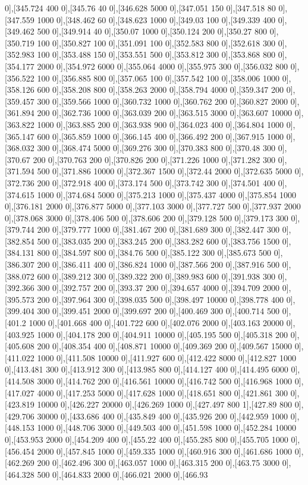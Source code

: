 {0],[345.724 400 0],[345.76 40 0],[346.628 5000 0],[347.051 150 0],[347.518 80 0],[347.559 1000 0],[348.462 60 0],[348.623 1000 0],[349.03 100 0],[349.339 400 0],[349.462 500 0],[349.914 40 0],[350.07 1000 0],[350.124 200 0],[350.27 800 0],[350.719 100 0],[350.827 100 0],[351.091 100 0],[352.583 800 0],[352.618 300 0],[352.983 100 0],[353.488 150 0],[353.551 500 0],[353.812 300 0],[353.868 800 0],[354.177 2000 0],[354.972 6000 0],[355.064 4000 0],[355.975 300 0],[356.032 800 0],[356.522 100 0],[356.885 800 0],[357.065 100 0],[357.542 100 0],[358.006 1000 0],[358.126 600 0],[358.208 800 0],[358.263 2000 0],[358.794 4000 0],[359.347 200 0],[359.457 300 0],[359.566 1000 0],[360.732 1000 0],[360.762 200 0],[360.827 2000 0],[361.894 200 0],[362.736 1000 0],[363.039 200 0],[363.515 3000 0],[363.607 10000 0],[363.822 1000 0],[363.885 200 0],[363.938 900 0],[364.023 400 0],[364.804 1000 0],[365.147 600 0],[365.859 1000 0],[366.145 400 0],[366.492 200 0],[367.915 1000 0],[368.032 300 0],[368.474 5000 0],[369.276 300 0],[370.383 800 0],[370.48 300 0],[370.67 200 0],[370.763 200 0],[370.826 200 0],[371.226 1000 0],[371.282 300 0],[371.594 500 0],[371.886 10000 0],[372.367 1500 0],[372.44 2000 0],[372.635 5000 0],[372.736 200 0],[372.918 400 0],[373.174 500 0],[373.742 300 0],[374.501 400 0],[374.615 1000 0],[374.684 5000 0],[375.213 1000 0],[375.437 4000 0],[375.854 1000 0],[376.181 2000 0],[376.877 5000 0],[377.103 3000 0],[377.727 500 0],[377.937 2000 0],[378.068 3000 0],[378.406 500 0],[378.606 200 0],[379.128 500 0],[379.173 300 0],[379.744 200 0],[379.777 1000 0],[381.467 200 0],[381.689 300 0],[382.447 300 0],[382.854 500 0],[383.035 200 0],[383.245 200 0],[383.282 600 0],[383.756 1500 0],[384.131 800 0],[384.597 800 0],[384.76 500 0],[385.122 300 0],[385.673 500 0],[386.307 200 0],[386.411 400 0],[386.824 1000 0],[387.566 200 0],[387.916 500 0],[388.072 600 0],[389.212 300 0],[389.322 200 0],[389.983 600 0],[391.938 300 0],[392.366 300 0],[392.757 200 0],[393.37 200 0],[394.657 4000 0],[394.709 2000 0],[395.573 200 0],[397.964 300 0],[398.035 500 0],[398.497 10000 0],[398.778 400 0],[399.404 300 0],[399.451 2000 0],[399.697 200 0],[400.469 300 0],[400.714 500 0],[401.2 1000 0],[401.668 400 0],[401.722 600 0],[402.076 2000 0],[403.163 20000 0],[403.925 1000 0],[404.178 200 0],[404.911 10000 0],[405.195 500 0],[405.318 200 0],[405.608 200 0],[408.354 400 0],[408.871 10000 0],[409.369 200 0],[409.567 15000 0],[411.022 1000 0],[411.508 10000 0],[411.927 600 0],[412.422 8000 0],[412.827 1000 0],[413.481 300 0],[413.912 300 0],[413.985 800 0],[414.127 400 0],[414.495 6000 0],[414.508 3000 0],[414.762 200 0],[416.561 10000 0],[416.742 500 0],[416.968 1000 0],[417.027 4000 0],[417.253 5000 0],[417.628 1000 0],[418.651 800 0],[421.861 300 0],[423.819 10000 0],[426.227 20000 0],[426.269 1000 0],[427.497 800 1],[427.89 800 0],[429.706 30000 0],[433.686 400 0],[435.849 400 0],[435.926 200 0],[442.959 1000 0],[448.153 1000 0],[448.706 3000 0],[449.503 400 0],[451.598 1000 0],[452.284 10000 0],[453.953 2000 0],[454.209 400 0],[455.22 400 0],[455.285 800 0],[455.705 1000 0],[456.454 2000 0],[457.845 1000 0],[459.335 1000 0],[460.916 300 0],[461.686 1000 0],[462.269 200 0],[462.496 300 0],[463.057 1000 0],[463.315 200 0],[463.75 3000 0],[464.328 500 0],[464.833 2000 0],[466.021 2000 0],[466.93 }
